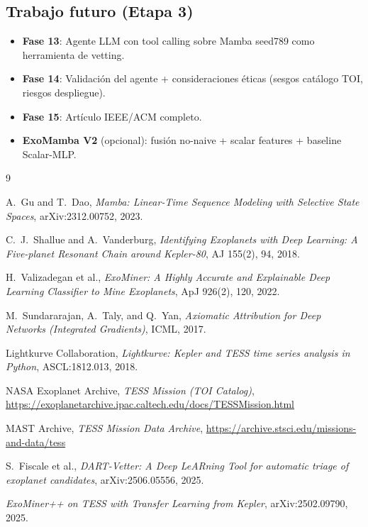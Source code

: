 \documentclass[11pt, a4paper]{article}
\begin{document}
\subsection*{Trabajo futuro (Etapa 3)}

\begin{itemize}[leftmargin=*, topsep=0pt]
    \item \textbf{Fase 13}: Agente LLM con tool calling sobre Mamba seed789 como herramienta de vetting.
    \item \textbf{Fase 14}: Validación del agente + consideraciones éticas (sesgos catálogo TOI, riesgos despliegue).
    \item \textbf{Fase 15}: Artículo IEEE/ACM completo.
    \item \textbf{ExoMamba V2} (opcional): fusión no-naive + scalar features + baseline Scalar-MLP.
\end{itemize}

\begin{thebibliography}{9}

 A.~Gu and T.~Dao, \emph{Mamba: Linear-Time Sequence Modeling with Selective State Spaces}, arXiv:2312.00752, 2023.

 C.~J.~Shallue and A.~Vanderburg, \emph{Identifying Exoplanets with Deep Learning: A Five-planet Resonant Chain around Kepler-80}, AJ 155(2), 94, 2018.

 H.~Valizadegan et al., \emph{ExoMiner: A Highly Accurate and Explainable Deep Learning Classifier to Mine Exoplanets}, ApJ 926(2), 120, 2022.

 M.~Sundararajan, A.~Taly, and Q.~Yan, \emph{Axiomatic Attribution for Deep Networks (Integrated Gradients)}, ICML, 2017.

 Lightkurve Collaboration, \emph{Lightkurve: Kepler and TESS time series analysis in Python}, ASCL:1812.013, 2018.

 NASA Exoplanet Archive, \emph{TESS Mission (TOI Catalog)}, \url{https://exoplanetarchive.ipac.caltech.edu/docs/TESSMission.html}

 MAST Archive, \emph{TESS Mission Data Archive}, \url{https://archive.stsci.edu/missions-and-data/tess}

 S.~Fiscale et al., \emph{DART-Vetter: A Deep LeARning Tool for automatic triage of exoplanet candidates}, arXiv:2506.05556, 2025.

 \emph{ExoMiner++ on TESS with Transfer Learning from Kepler}, arXiv:2502.09790, 2025.

\end{thebibliography}
\end{document}
